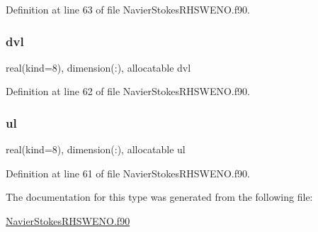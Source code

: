 Definition at line 63 of file Navier\+Stokes\+R\+H\+S\+W\+E\+N\+O.\+f90.

\hypertarget{structnavierstokesrhsweno_1_1characteristic__local_a5a45a3f309780c73848885e60e2397e4}{}\label{structnavierstokesrhsweno_1_1characteristic__local_a5a45a3f309780c73848885e60e2397e4} 
\subsubsection{\texorpdfstring{dvl}{dvl}}
{\footnotesize\ttfamily real(kind=8), dimension(\+:), allocatable dvl}



Definition at line 62 of file Navier\+Stokes\+R\+H\+S\+W\+E\+N\+O.\+f90.

\hypertarget{structnavierstokesrhsweno_1_1characteristic__local_a5c06967f28c037eba665af6d7fa98c25}{}\label{structnavierstokesrhsweno_1_1characteristic__local_a5c06967f28c037eba665af6d7fa98c25} 
\subsubsection{\texorpdfstring{ul}{ul}}
{\footnotesize\ttfamily real(kind=8), dimension(\+:), allocatable ul}



Definition at line 61 of file Navier\+Stokes\+R\+H\+S\+W\+E\+N\+O.\+f90.



The documentation for this type was generated from the following file\+:\begin{DoxyCompactItemize}
\item 
\hyperlink{NavierStokesRHSWENO_8f90}{Navier\+Stokes\+R\+H\+S\+W\+E\+N\+O.\+f90}\end{DoxyCompactItemize}
